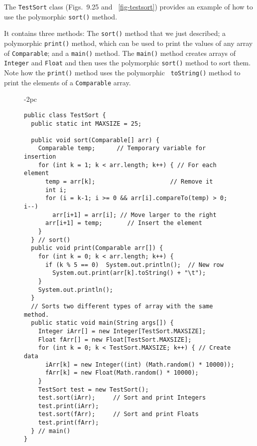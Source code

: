 The {\tt TestSort} class (Figs.~9.25 and ~\ref{fig-testsort}) provides
an example of how to use the polymorphic {\tt sort()} method.

It contains three methods: The {\tt sort()} method that we just
described; a polymorphic {\tt print()} method, which can be used to
print the values of any array of {\tt Comparable}; and a {\tt main()}
method. The {\tt main()} method creates arrays of {\tt Integer} and
{\tt Float} and then uses the polymorphic {\tt sort()} method to sort
them.  Note how the {\tt print()} method uses the polymorphic {\tt
toString()} method to print the elements of a {\tt Comparable} array.

\begin{figure}[bth]
\jjjprogstart
\begin{jjjlistingleft}[28pc]{-2pc}
\begin{lstlisting}
public class TestSort {
  public static int MAXSIZE = 25;

  public void sort(Comparable[] arr) {
    Comparable temp;      // Temporary variable for insertion
    for (int k = 1; k < arr.length; k++) { // For each element
      temp = arr[k];                     // Remove it 
      int i;
      for (i = k-1; i >= 0 && arr[i].compareTo(temp) > 0; i--) 
        arr[i+1] = arr[i]; // Move larger to the right
      arr[i+1] = temp;       // Insert the element
    }
  } // sort()
  public void print(Comparable arr[]) {
    for (int k = 0; k < arr.length; k++) {
      if (k % 5 == 0)  System.out.println();  // New row  
        System.out.print(arr[k].toString() + "\t"); 
    }
    System.out.println();
  }
  // Sorts two different types of array with the same method.
  public static void main(String args[]) {
    Integer iArr[] = new Integer[TestSort.MAXSIZE]; 
    Float fArr[] = new Float[TestSort.MAXSIZE];   
    for (int k = 0; k < TestSort.MAXSIZE; k++) { // Create data
      iArr[k] = new Integer((int) (Math.random() * 10000));
      fArr[k] = new Float(Math.random() * 10000);
    }
    TestSort test = new TestSort();
    test.sort(iArr);     // Sort and print Integers
    test.print(iArr);
    test.sort(fArr);     // Sort and print Floats
    test.print(fArr);                      
  } // main()
}
\end{lstlisting}
\end{jjjlistingleft}
\end{figure}



